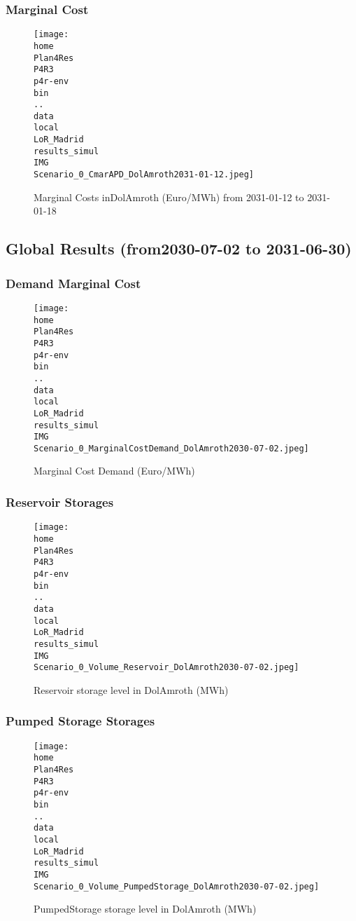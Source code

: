 \documentclass[10pt]{report}
\begin{document}
\subsubsection{Marginal Cost}
\begin{figure}[H]
\centering
\texttt{[image: \\home\\Plan4Res\\P4R3\\p4r-env\\bin\\..\\data\\local\\LoR\_Madrid\\results\_simul\\IMG\\Scenario\_0\_CmarAPD\_DolAmroth2031-01-12.jpeg]}
\caption{Marginal Costs inDolAmroth (Euro/MWh) from 2031-01-12 to 2031-01-18}
\label{fig:Scenario_0_CmarAPD_DolAmroth2031-01-12.jpeg}
\end{figure}
\subsection{Global Results (from2030-07-02 to 2031-06-30)}
\subsubsection{Demand Marginal Cost}
\begin{figure}[H]
\centering
\texttt{[image: \\home\\Plan4Res\\P4R3\\p4r-env\\bin\\..\\data\\local\\LoR\_Madrid\\results\_simul\\IMG\\Scenario\_0\_MarginalCostDemand\_DolAmroth2030-07-02.jpeg]}
\caption{Marginal Cost Demand (Euro/MWh)}
\label{fig:Scenario_0_MarginalCostDemand_DolAmroth2030-07-02.jpeg}
\end{figure}
\subsubsection{Reservoir Storages}
\begin{figure}[H]
\centering
\texttt{[image: \\home\\Plan4Res\\P4R3\\p4r-env\\bin\\..\\data\\local\\LoR\_Madrid\\results\_simul\\IMG\\Scenario\_0\_Volume\_Reservoir\_DolAmroth2030-07-02.jpeg]}
\caption{Reservoir storage level in DolAmroth (MWh)}
\label{fig:Scenario_0_Volume_Reservoir_DolAmroth2030-07-02.jpeg}
\end{figure}
\subsubsection{Pumped Storage Storages}
\begin{figure}[H]
\centering
\texttt{[image: \\home\\Plan4Res\\P4R3\\p4r-env\\bin\\..\\data\\local\\LoR\_Madrid\\results\_simul\\IMG\\Scenario\_0\_Volume\_PumpedStorage\_DolAmroth2030-07-02.jpeg]}
\caption{PumpedStorage storage level in DolAmroth (MWh)}
\label{fig:Scenario_0_Volume_PumpedStorage_DolAmroth2030-07-02.jpeg}
\end{figure}
\end{document}
